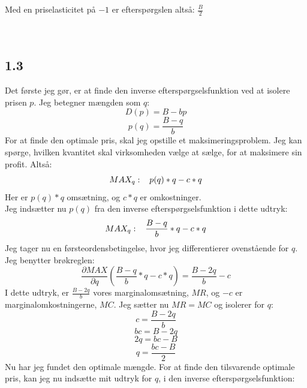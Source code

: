 \documentclass{article}
\begin{document}
Med en priselasticitet på $-1$ er efterspørgslen altså: $\frac{B}{2}$
\\
\\
\\
\subsection*{1.3}
Det første jeg gør, er at finde den inverse efterspørgselsfunktion ved at isolere prisen $p$. Jeg betegner mængden som $q$:
\begin{equation}
    D(p)=B-bp
\end{equation}
\begin{equation}
    p(q)=\frac{B-q}{b}
\end{equation}
For at finde den optimale pris, skal jeg opstille et maksimeringsproblem. Jeg kan spørge, hvilken kvantitet skal virksomheden vælge at sælge, for at maksimere sin profit. Altså: 
\begin{equation}
    MAX_q:\hspace{0.3cm} p(q)*q-c*q
\end{equation}
Her er $p(q)*q$ omsætning, og $c*q$ er omkostninger. 
\\
Jeg indsætter nu $p(q)$ fra den inverse efterspørgselsfunktion i dette udtryk:
\begin{equation}
    MAX_q: \hspace{0.3cm} \frac{B-q}{b} *q-c*q
\end{equation}
Jeg tager nu en førsteordensbetingelse, hvor jeg differentierer ovenstående for $q$. Jeg benytter brøkreglen:
\begin{equation}
    \frac{\partial MAX}{\partial q}(\frac{B-q}{b} *q-c*q) = \frac{B-2q}{b}-c
\end{equation}
I dette udtryk, er $\frac{B-2q}{b}$ vores marginalomsætning, $MR$, og $-c$ er marginalomkostningerne, $MC$. Jeg sætter nu $MR=MC$ og isolerer for $q$:
\begin{equation}
    c=\frac{B-2q}{b}
\end{equation}
\begin{equation}
    bc=B-2q
\end{equation}
\begin{equation}
    2q=bc-B
\end{equation}
\begin{equation}
    q=\frac{bc-B}{2}
\end{equation}
Nu har jeg fundet den optimale mængde. For at finde den tilsvarende optimale pris, kan jeg nu indsætte mit udtryk for $q$, i den inverse efterspørgselsfunktion:
\end{document}

